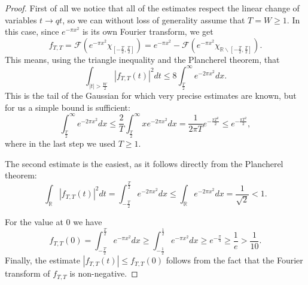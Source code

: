 \documentclass[10pt,a4paper]{amsart}
\newcommand{\F}{\mathcal{F}}
\newcommand{\R}{\mathbb{R}}
\begin{document}
\begin{proof}
First of all we notice that all of the estimates respect the linear change of variables $t\to qt$, so we can without loss of generality assume that $T = W\ge 1$. In this case, since $e^{-\pi x^2}$ is its own Fourier transform, we get
 $$f_{T,T} = \F \left(e^{-\pi x^2} \chi_{[-\frac{T}{2},\frac{T}{2}]}\right) = e^{-\pi x^2} - \F \left(e^{-\pi x^2} \chi_{\R\backslash [-\frac{T}{2},\frac{T}{2}]}\right).$$
This means, using the triangle inequality and the Plancherel theorem, that 
$$\int_{|t| > \frac{W}{2}} |f_{T, T}(t)|^2 dt \le 8\int_{\frac{T}{2}}^\infty e^{-2\pi x^2}dx.$$
This is the tail of the Gaussian for which very precise estimates are known, but for us a simple bound is sufficient:
$$\int_{\frac{T}{2}}^\infty e^{-2\pi x^2}dx \le \frac{2}{T}\int_{\frac{T}{2}}^\infty xe^{-2 \pi x^2}dx = \frac{1}{2\pi T}e^{-\frac{\pi T^2}{2}} \le e^{-\frac{\pi T^2}{2}},$$
where in the last step we used $T \ge 1$.

The second estimate is the easiest, as it follows directly from the Plancherel theorem:
$$\int_\R |f_{T,T}(t)|^2dt = \int_{-\frac{T}{2}}^{\frac{T}{2}} e^{-2\pi x^2}dx \le \int_\R e^{-2\pi x^2}dx =\frac{1}{\sqrt{2}} < 1.$$

For the value at $0$ we have
$$f_{T,T}(0) = \int_{-\frac{T}{2}}^{\frac{T}{2}}e^{-\pi x^2}dx \ge \int_{-\frac{1}{2}}^{\frac{1}{2}}e^{-\pi x^2}dx \ge e^{-\frac{\pi}{4}} \ge \frac{1}{e} > \frac{1}{10}.$$
Finally, the estimate $|f_{T,T}(t)|\le f_{T,T}(0)$ follows from the fact that the Fourier transform of $f_{T,T}$ is non-negative.
\end{proof}
\end{document}
